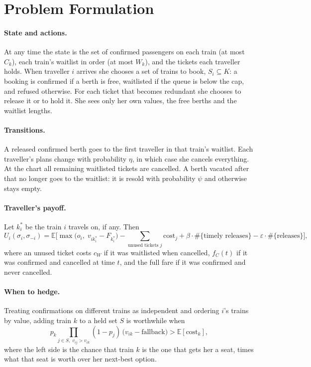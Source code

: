 \documentclass{article}
\theoremstyle{definition}
\begin{document}
\section{Problem Formulation}

\paragraph{State and actions.} At any time the state is the set of confirmed passengers on
each train (at most $C_k$), each train's waitlist in order (at most $W_k$), and the tickets
each traveller holds. When traveller $i$ arrives she chooses a set of trains to book,
$S_i \subseteq K$: a booking is confirmed if a berth is free, waitlisted if the queue is
below the cap, and refused otherwise. For each ticket that becomes redundant she chooses to
release it or to hold it. She sees only her own values, the free berths and the waitlist
lengths.

\paragraph{Transitions.} A released confirmed berth goes to the first traveller in that
train's waitlist. Each traveller's plans change with probability $\eta$, in which case she
cancels everything. At the chart all remaining waitlisted tickets are cancelled. A berth
vacated after that no longer goes to the waitlist: it is resold with probability $\psi$ and
otherwise stays empty.

\paragraph{Traveller's payoff.} Let $k_i^*$ be the train $i$ travels on, if any. Then
\begin{equation}
U_i(\sigma_i,\sigma_{-i}) = \mathbb{E}\Big[\max\big(o_i,\; v_{ik_i^*}-F_{k_i^*}\big)
 - \!\!\sum_{\text{unused tickets } j}\!\! \text{cost}_j
 + \beta\cdot\#\{\text{timely releases}\} - \varepsilon\cdot\#\{\text{releases}\}\Big],
\label{eq:payoff}
\end{equation}
where an unused ticket costs $c_W$ if it was waitlisted when cancelled, $f_C(t)$ if it was
confirmed and cancelled at time $t$, and the full fare if it was confirmed and never
cancelled.

\paragraph{When to hedge.} Treating confirmations on different trains as independent and
ordering $i$'s trains by value, adding train $k$ to a held set $S$ is worthwhile when
\begin{equation}
p_k \prod_{j\in S,\; v_{ij}>v_{ik}} (1-p_j)\,\big(v_{ik}-\text{fallback}\big) > \mathbb{E}[\text{cost}_k],
\label{eq:hedge}
\end{equation}
where the left side is the chance that train $k$ is the one that gets her a seat, times
what that seat is worth over her next-best option.
\end{document}
